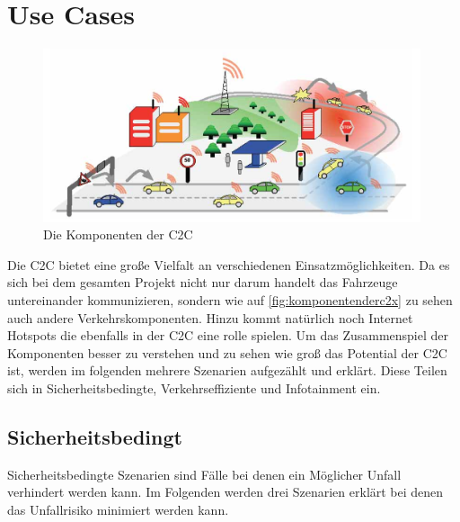 \chapter{Use Cases\label{chap:usecases}}
\begin{figure}[htbp]
\includegraphics[width=0.99\textwidth]{content/images/06_use_cases/komponenten.png}
\caption{Die Komponenten der \acl{C2C}}
\label{fig:komponentenderc2x}
\end{figure}
Die \acl{C2C} bietet eine große Vielfalt an verschiedenen Einsatzmöglichkeiten. Da es sich bei dem gesamten Projekt nicht nur darum handelt das Fahrzeuge untereinander kommunizieren, sondern wie auf \autoref{fig:komponentenderc2x} zu sehen auch andere Verkehrskomponenten. Hinzu kommt natürlich noch Internet Hotspots die ebenfalls in der C2C eine rolle spielen. Um das Zusammenspiel der Komponenten besser zu verstehen und zu sehen wie groß das Potential der \acl{C2C} ist, werden im folgenden mehrere Szenarien aufgezählt und erklärt. Diese Teilen sich in Sicherheitsbedingte, Verkehrseffiziente und Infotainment ein. 

\section{Sicherheitsbedingt}
Sicherheitsbedingte Szenarien sind Fälle bei denen ein Möglicher Unfall verhindert werden kann. Im Folgenden werden drei Szenarien erklärt bei denen das Unfallrisiko minimiert werden kann.
